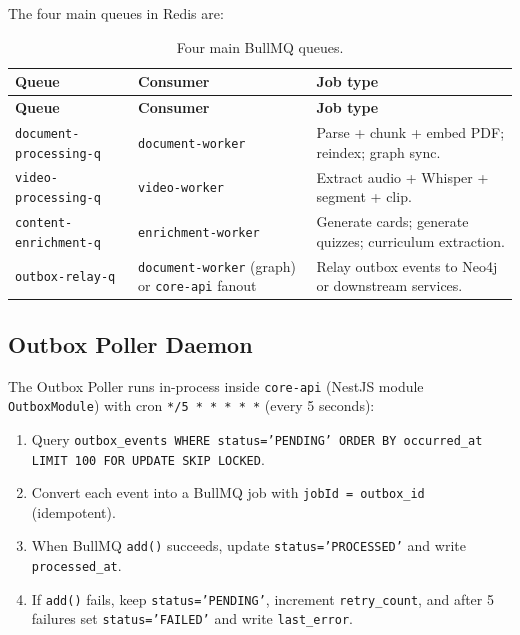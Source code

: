 The four main queues in Redis are:

\begin{longtable}{|p{4cm}|p{2.5cm}|p{7cm}|}
\caption{Four main BullMQ queues.}
\label{tab:bullmq-queues} \\
\hline
\textbf{Queue} & \textbf{Consumer} & \textbf{Job type} \\
\hline
\endfirsthead
\hline
\textbf{Queue} & \textbf{Consumer} & \textbf{Job type} \\
\hline
\endhead

\texttt{document-}\allowbreak\texttt{processing-q}
    & \texttt{document-}\allowbreak\texttt{worker}
    & Parse + chunk + embed PDF; reindex; graph sync. \\
\hline
\texttt{video-}\allowbreak\texttt{processing-q}
    & \texttt{video-}\allowbreak\texttt{worker}
    & Extract audio + Whisper + segment + clip. \\
\hline
\texttt{content-}\allowbreak\texttt{enrichment-q}
    & \texttt{enrichment-}\allowbreak\texttt{worker}
    & Generate cards; generate quizzes; curriculum extraction. \\
\hline
\texttt{outbox-}\allowbreak\texttt{relay-q}
    & \texttt{document-}\allowbreak\texttt{worker} (graph) or
    \texttt{core-api} fanout
    & Relay outbox events to Neo4j or downstream services. \\
\hline
\end{longtable}

\subsection{Outbox Poller Daemon}

The Outbox Poller runs in-process inside \texttt{core-api} (NestJS
module \texttt{OutboxModule}) with cron \texttt{*/5 * * * * *} (every
5 seconds):

\begin{enumerate}
    \item Query \texttt{outbox\_events WHERE status='PENDING' ORDER BY
          occurred\_at LIMIT 100 FOR UPDATE SKIP LOCKED}.
    \item Convert each event into a BullMQ job with
          \texttt{jobId = outbox\_id} (idempotent).
    \item When BullMQ \texttt{add()} succeeds, update
          \texttt{status='PROCESSED'} and write
          \texttt{processed\_at}.
    \item If \texttt{add()} fails, keep \texttt{status='PENDING'},
          increment \texttt{retry\_count}, and after 5 failures set
          \texttt{status='FAILED'} and write \texttt{last\_error}.
\end{enumerate}

